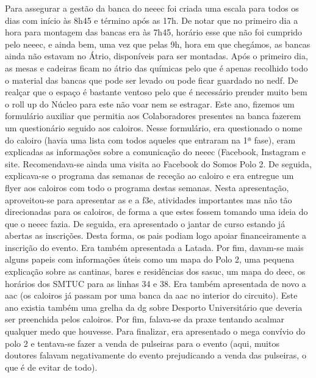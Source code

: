 Para assegurar a gestão da banca do \acrshort{neeec} foi criada uma escala para todos os dias com início às 8h45 e término após as 17h. De notar que no primeiro dia a hora para montagem das bancas era às 7h45, horário esse que não foi cumprido pelo \acrshort{neeec}, e ainda bem, uma vez que pelas 9h, hora em que chegámos, as bancas ainda não estavam no Átrio, disponíveis para ser montadas. Após o primeiro dia, as mesas e cadeiras ficam no átrio das químicas pelo que é apenas recolhido todo o material das bancas que pode ser levado ou pode ficar guardado no \acrshort{nedf}. De realçar que o espaço é bastante ventoso pelo que é necessário prender muito bem o roll up do Núcleo para este não voar nem se estragar. Este ano, fizemos um formulário auxiliar que permitia aos Colaboradores presentes na banca fazerem um questionário seguido aos caloiros. Nesse formulário, era questionado o nome do caloiro (havia uma lista com todos aqueles que entraram na 1ª fase), eram explicadas as informações sobre a comunicação do \acrshort{neeec} (Facebook, Instagram e site. Recomendava-se ainda uma visita ao Facebook do Somos Polo 2. De seguida, explicava-se o programa das semanas de receção ao caloiro e era entregue um flyer aos caloiros com todo o programa destas semanas. Nesta apresentação, aproveitou-se para apresentar as  e a \acrshort{f3e}, atividades importantes mas não tão direcionadas para os caloiros, de forma a que estes fossem tomando uma ideia do que o \acrshort{neeec} fazia. De seguida, era apresentado o jantar de curso estando já abertas as inscrições. Desta forma, os pais podiam logo apoiar financeiramente a inscrição do evento. Era também apresentada a Latada. Por fim, davam-se mais alguns papeis com informações úteis como um mapa do Polo 2, uma pequena explicação sobre as cantinas, bares e residências dos \acrshort{sasuc}, um mapa do \acrshort{deec}, os horários dos SMTUC para as linhas 34 e 38. Era também apresentada de novo a \acrshort{aac} (os caloiros já passam por uma banca da \acrshort{aac} no interior do circuito). Este ano existia também uma grelha da \acrshort{dg} sobre Desporto Universitário que deveria ser preenchida pelos caloiros. Por fim, falava-se da praxe tentando acalmar qualquer medo que houvesse. Para finalizar, era apresentado o mega convívio do polo 2 e tentava-se fazer a venda de pulseiras para o evento (aqui, muitos doutores falavam negativamente do evento prejudicando a venda das pulseiras, o que é de evitar de todo).

